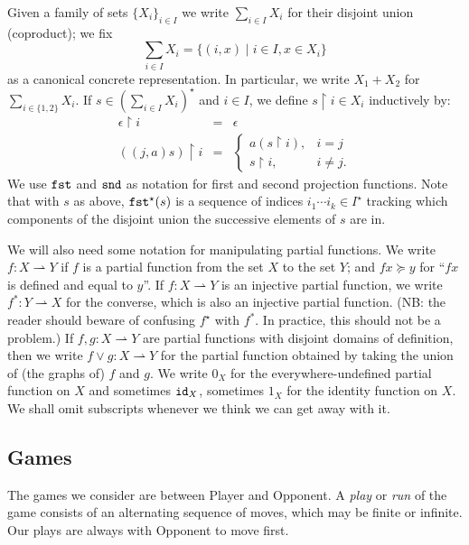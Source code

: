 \documentclass[11pt]{article}
\newcommand{\Fst}{{\tt fst}}
\newcommand{\Snd}{{\tt snd}}
\newcommand{\Rest}{{\upharpoonright}}
\newcommand{\Eqdef}{\succeq}
\newcommand{\Pfr}{\rightharpoonup}
\begin{document}
Given a family of sets $\{ X_i \}_{i \in I}$ we write $\sum_{i \in I} X_i$
for their disjoint union (coproduct); we fix
\[ \sum_{i \in I} X_i  =  \{ (i, x) \mid i \in I, x \in X_i \} \]
as a canonical concrete representation. In particular, we write
$X_{1} + X_{2}$ for $\sum_{i \in \{ 1,2 \}} X_i$.
If $s \in (\sum_{i \in I} X_{i})^{\star}$ and $i \in I$,
we define $s \Rest i \in X_{i}$ inductively by:
\[ \begin{array}{lcl}
\epsilon \Rest i & = & \epsilon \\
((j, a)s) \Rest i & = & \left\{ \begin{array}{ll}
a(s \Rest i), & i = j \\
s \Rest i, & i \neq j.
\end{array} \right.
\end{array} \]
We use $\Fst$ and $\Snd$ as notation for first and second projection functions.
Note that with $s$ as above, $\Fst^{\star}(s)$ is a sequence of indices $i_{1} \cdots
i_{k} \in I^{\star}$ tracking which components of the disjoint union the
successive elements of $s$ are in.

We will also need some notation for manipulating partial functions.
We write $f : X \Pfr Y$ if $f$ is a partial function from the set $X$ to
the set $Y$; and $fx \Eqdef y$ for ``$fx$ is defined and equal to $y$''.
If $f : X \Pfr Y$ is an injective partial function, we write $f^{\ast} : Y \Pfr
X$  for the converse, which is also an injective partial function.
(NB: the reader should beware of confusing $f^{\star}$ with $f^{\ast}$.
In practice, this should not be a problem.)
If $f, g : X \Pfr Y$ are partial functions with disjoint domains
of definition, then we write $f \vee g : X \Pfr Y$  for the
partial function obtained by taking  the union of (the graphs of) $f$ and $g$.
We write $0_{X}$ for the everywhere-undefined partial function on $X$ and
sometimes ${\tt id}_{X}$, sometimes $1_{X}$ for the identity function on $X$.
We shall omit subscripts whenever we think
we can get away with it.

\subsection{Games}
The games we consider are between Player and Opponent.  A {\em play} or {\em
run} of the game consists of an alternating sequence of moves, which may be
finite or infinite.  Our plays are always with Opponent to move first.
\end{document}
